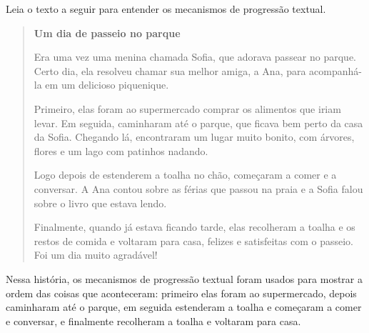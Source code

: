 
Leia o texto a seguir para entender os mecanismos de progressão textual.

\begin{quote}
\textbf{Um dia de passeio no parque}

Era uma vez uma menina chamada Sofia, que adorava passear no parque.
Certo dia, ela resolveu chamar sua melhor amiga, a Ana, para
acompanhá-la em um delicioso piquenique.

Primeiro, elas foram ao supermercado comprar os alimentos que iriam
levar. Em seguida, caminharam até o parque, que ficava bem perto da casa
da Sofia. Chegando lá, encontraram um lugar muito bonito, com árvores,
flores e um lago com patinhos nadando.

Logo depois de estenderem a toalha no chão, começaram a comer e a
conversar. A Ana contou sobre as férias que passou na praia e a Sofia
falou sobre o livro que estava lendo.

Finalmente, quando já estava ficando tarde, elas recolheram a toalha e
os restos de comida e voltaram para casa, felizes e satisfeitas com o
passeio. Foi um dia muito agradável!
\end{quote}

Nessa história, os mecanismos de progressão textual foram usados para
mostrar a ordem das coisas que aconteceram: primeiro elas foram ao
supermercado, depois caminharam até o parque, em seguida estenderam a
toalha e começaram a comer e conversar, e finalmente recolheram a toalha
e voltaram para casa.

